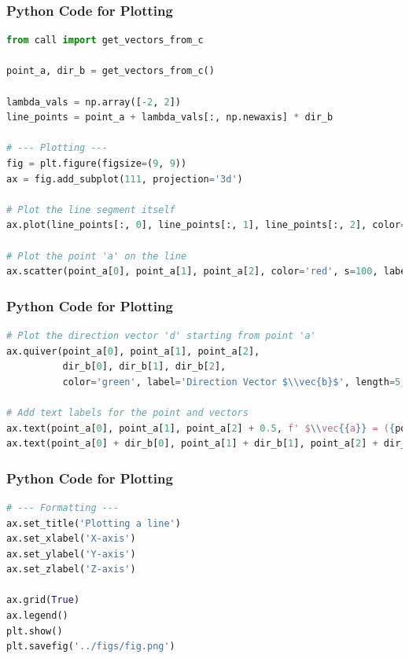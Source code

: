 \documentclass{beamer}
\theoremstyle{remark}
\let\vec\mathbf
\numberwithin{equation}{section}
\begin{document}
\begin{frame}[fragile]
\frametitle{Python Code for Plotting}
\begin{lstlisting}[language=Python]
from call import get_vectors_from_c

point_a, dir_b = get_vectors_from_c()
 
lambda_vals = np.array([-2, 2])
line_points = point_a + lambda_vals[:, np.newaxis] * dir_b

# --- Plotting ---
fig = plt.figure(figsize=(9, 9))
ax = fig.add_subplot(111, projection='3d')

# Plot the line segment itself
ax.plot(line_points[:, 0], line_points[:, 1], line_points[:, 2], color='blue', label='The Line')

# Plot the point 'a' on the line
ax.scatter(point_a[0], point_a[1], point_a[2], color='red', s=100, label='Point $\\vec{a}$')

\end{lstlisting}
\end{frame}

\begin{frame}[fragile]
\frametitle{Python Code for Plotting}
\begin{lstlisting}[language=Python]
  # Plot the direction vector 'd' starting from point 'a'
ax.quiver(point_a[0], point_a[1], point_a[2], 
          dir_b[0], dir_b[1], dir_b[2], 
          color='green', label='Direction Vector $\\vec{b}$', length=5, arrow_length_ratio=0.3)

# Add text labels for the point and vectors
ax.text(point_a[0], point_a[1], point_a[2] + 0.5, f' $\\vec{{a}} = ({point_a[0]:.0f}, {point_a[1]:.0f}, {point_a[2]:.0f})$')
ax.text(point_a[0] + dir_b[0], point_a[1] + dir_b[1], point_a[2] + dir_b[2], ' $\\vec{b}$')
\end{lstlisting}
\end{frame}

\begin{frame}[fragile]
\frametitle{Python Code for Plotting}
\begin{lstlisting}[language=Python]
# --- Formatting ---
ax.set_title('Plotting a line')
ax.set_xlabel('X-axis')
ax.set_ylabel('Y-axis')
ax.set_zlabel('Z-axis')

ax.grid(True)
ax.legend()
plt.show()
plt.savefig('../figs/fig.png')
\end{lstlisting}
\end{frame}
\end{document}
